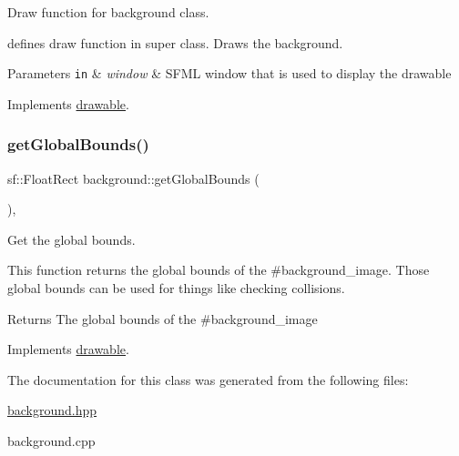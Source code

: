 Draw function for background class. 

defines draw function in super class. Draws the background.


\begin{DoxyParams}[1]{Parameters}
\mbox{\tt in}  & {\em window} & S\+F\+ML window that is used to display the drawable \\
\hline
\end{DoxyParams}


Implements \hyperlink{classdrawable_a4e49e2c1121704c83ce24c5f48dd910f}{drawable}.

\mbox{\label{classbackground_ab5f2b627cd58e0d07678f0af01c6bd2d}} 
\subsubsection{\texorpdfstring{get\+Global\+Bounds()}{getGlobalBounds()}}
{\footnotesize\ttfamily sf\+::\+Float\+Rect background\+::get\+Global\+Bounds (\begin{DoxyParamCaption}{ }\end{DoxyParamCaption})\hspace{0.3cm}{\ttfamily [override]}, {\ttfamily [virtual]}}



Get the global bounds. 

This function returns the global bounds of the \#background\+\_\+image. Those global bounds can be used for things like checking collisions.

\begin{DoxyReturn}{Returns}
The global bounds of the \#background\+\_\+image 
\end{DoxyReturn}


Implements \hyperlink{classdrawable_ae013ac0be47538be9ce885d6642daf73}{drawable}.



The documentation for this class was generated from the following files\+:\begin{DoxyCompactItemize}
\item 
\hyperlink{background_8hpp}{background.\+hpp}\item 
background.\+cpp\end{DoxyCompactItemize}
